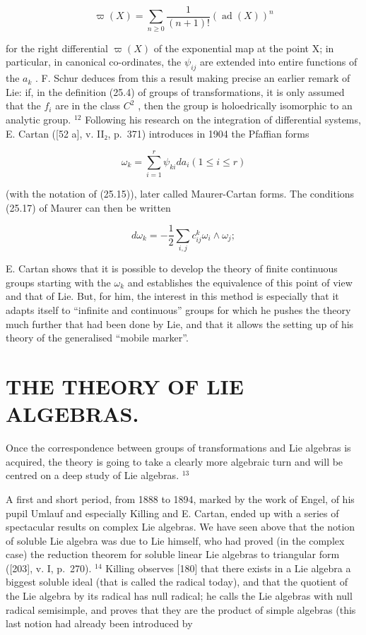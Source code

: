 \[
\varpi (X) = \sum_ {n \geq 0} \frac {1}{(n + 1) !} (\operatorname{ad} (X)) ^ {n}\tag{25.24}
\]

for the right differential \(\varpi(X)\) of the exponential map at the point X; in particular, in canonical co-ordinates, the \(\psi_{ij}\) are extended into entire functions of the \(a_{k}\) . F. Schur deduces from this a result making precise an earlier remark of Lie: if, in the definition (25.4) of groups of transformations, it is only assumed that the \(f_{i}\) are in the class \(C^{2}\) , then the group is holoedrically isomorphic to an analytic group. \(^{12}\) Following his research on the integration of differential systems, E. Cartan ({[}52 a{]}, v. II₂, p.~371) introduces in 1904 the Pfaffian forms

\[
\omega_ {k} = \sum_ {i = 1} ^ {r} \psi_ {k i} d a _ {i} (1 \leq i \leq r)\tag{25.25}
\]

(with the notation of (25.15)), later called Maurer-Cartan forms. The conditions (25.17) of Maurer can then be written

\[
d \omega_ {k} = - \frac {1}{2} \sum_ {i, j} c _ {i j} ^ {k} \omega_ {i} \wedge \omega_ {j};
\]

E. Cartan shows that it is possible to develop the theory of finite continuous groups starting with the \(\omega_{k}\) and establishes the equivalence of this point of view and that of Lie. But, for him, the interest in this method is especially that it adapts itself to ``infinite and continuous'' groups for which he pushes the theory much further that had been done by Lie, and that it allows the setting up of his theory of the generalised ``mobile marker''.

\section{THE THEORY OF LIE ALGEBRAS.}

Once the correspondence between groups of transformations and Lie algebras is acquired, the theory is going to take a clearly more algebraic turn and will be centred on a deep study of Lie algebras. \(^{13}\)

A first and short period, from 1888 to 1894, marked by the work of Engel, of his pupil Umlauf and especially Killing and E. Cartan, ended up with a series of spectacular results on complex Lie algebras. We have seen above that the notion of soluble Lie algebra was due to Lie himself, who had proved (in the complex case) the reduction theorem for soluble linear Lie algebras to triangular form ({[}203{]}, v. I, p.~270). \(^{14}\) Killing observes {[}180{]} that there exists in a Lie algebra a biggest soluble ideal (that is called the radical today), and that the quotient of the Lie algebra by its radical has null radical; he calls the Lie algebras with null radical semisimple, and proves that they are the product of simple algebras (this last notion had already been introduced by

